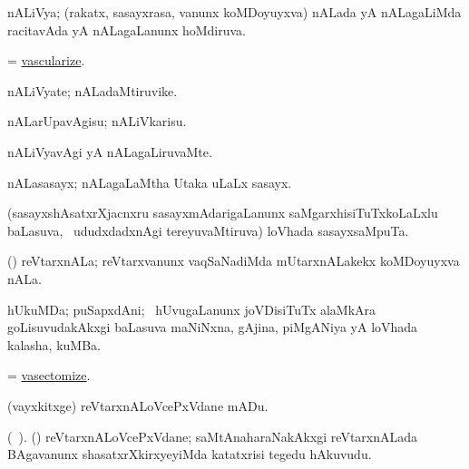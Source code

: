 \bentry
{} 
\gl{\gu}
\expl{}
\bmng
 nALiVya; (rakatx, sasayxrasa, \mo vanunx koMDoyuyxva) nALada yA nALagaLiMda racitavAda yA nALagaLanunx hoMdiruva. 
\emng
\eentry

\bentry
{} 
\gl{\sakirx}
\expl{}
\bmng
 = \hyperlink{vascularize}{vascularize}. 
\emng
\eentry

\bentry
{} 
\gl{\nA}
\expl{}
\bmng
 nALiVyate; nALadaMtiruvike. 
\emng
\eentry

\bentry
{} 
\gl{\sakirx}
\expl{}
\bmng
 nALarUpavAgisu; nALiVkarisu. 
\emng
\eentry

\bentry
{} 
\gl{\kirxvi}
\expl{}
\bmng
 nALiVyavAgi yA nALagaLiruvaMte. 
\emng
\eentry

\bentry
{}
\gl{\nA}
\expl{}
\bmng
 nALasasayx; nALagaLaMtha Utaka uLaLx sasayx. 
\emng
\eentry

\bentry
{} 
\gl{\nA}
\bmng
 (sasayxshAsatxrXjacnxru sasayxmAdarigaLanunx saMgarxhisiTuTxkoLaLxlu baLasuva, \sA\ ududxdadxnAgi tereyuvaMtiruva) loVhada sasayxsaMpuTa. 
\emng
\eentry

\bentry
{} 
\gl{\nA}
\bmng
 (\aMrashA) reVtarxnALa; reVtarxvanunx vaqSaNadiMda mUtarxnALakekx koMDoyuyxva nALa. 
\emng
\eentry

\bentry
{} 
\gl{\nA}
\expl{}
\bmng
 hUkuMDa; puSapxdAni; \kanmu\ hUvugaLanunx joVDisiTuTx alaMkAra goLisuvudakAkxgi baLasuva maNiNxna, gAjina, piMgANiya yA loVhada kalasha, kuMBa. 
\emng
\eentry

\bentry
{} 
\gl{\sakirx}
\expl{}
\bmng
 = \hyperlink{vasectomize}{vasectomize}. 
\emng
\eentry

\bentry
{} 
\gl{\sakirx}
\expl{}
\bmng
 (vayxkitxge) reVtarxnALoVcePxVdane mADu. 
\emng
\eentry

\bentry
{} 
\gl{\nA}(\bava\ ). 
\bmng
 (\shaveY) reVtarxnALoVcePxVdane; saMtAnaharaNakAkxgi reVtarxnALada BAgavanunx shasatxrXkirxyeyiMda katatxrisi tegedu hAkuvudu. 
\emng
\eentry

